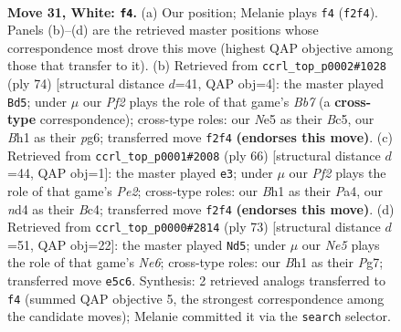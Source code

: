 \documentclass[11pt]{article}
\begin{document}
\clearpage

\begin{figure}[p]\centering
\begin{subfigure}{0.46\textwidth}\centering
\resizebox{\linewidth}{!}{%
\newchessgame
\chessboard[
  setfen={8/8/4k3/2ppNp2/3n4/1p6/1P2bP2/1K2B2B w - - 4 31},
  showmover=false,
  pgfstyle=straightmove, color=movearrow, markmove={f2-f4}
]}
\caption{}
\end{subfigure}\hfill
\begin{subfigure}{0.46\textwidth}\centering
\resizebox{\linewidth}{!}{%
\newchessgame
\chessboard[
  setfen={8/1B2ppk1/6p1/1bB2n2/1P3P2/7P/6K1/8 w - - 4 38},
  showmover=false,
  pgfstyle=straightmove, color=movearrow, markmove={b7-d5}
]}
\caption{}
\end{subfigure}
\\[4pt]
\begin{subfigure}{0.46\textwidth}\centering
\resizebox{\linewidth}{!}{%
\newchessgame
\chessboard[
  setfen={8/2B1k2p/5np1/p7/P1B1pP2/7P/3bPK2/8 w - - 6 34},
  showmover=false,
  pgfstyle=straightmove, color=movearrow, markmove={e2-e3}
]}
\caption{}
\end{subfigure}\hfill
\begin{subfigure}{0.46\textwidth}\centering
\resizebox{\linewidth}{!}{%
\newchessgame
\chessboard[
  setfen={4b3/5pp1/3kp3/7P/5P2/PN2nB2/1P1K4/8 b - - 2 37},
  showmover=false,
  pgfstyle=straightmove, color=movearrow, markmove={e3-d5}
]}
\caption{}
\end{subfigure}
\caption{\textbf{Move 31, White: \texttt{f4}.} (a) Our position; Melanie plays \texttt{f4} (\texttt{f2f4}). Panels (b)--(d) are the retrieved master positions whose correspondence most drove this move (highest QAP objective among those that transfer to it). (b) Retrieved from \texttt{ccrl\_top\_p0002\#1028} (ply 74) [structural distance $d$=41, QAP obj=4]: the master played \texttt{Bd5}; under $\mu$ our \emph{Pf2} plays the role of that game's \emph{Bb7} (a \textbf{cross-type} correspondence); cross-type roles: our \emph{N}e5 as their \emph{B}c5, our \emph{B}h1 as their \emph{p}g6; transferred move \texttt{f2f4} \textbf{(endorses this move)}. (c) Retrieved from \texttt{ccrl\_top\_p0001\#2008} (ply 66) [structural distance $d$=44, QAP obj=1]: the master played \texttt{e3}; under $\mu$ our \emph{Pf2} plays the role of that game's \emph{Pe2}; cross-type roles: our \emph{B}h1 as their \emph{P}a4, our \emph{n}d4 as their \emph{B}c4; transferred move \texttt{f2f4} \textbf{(endorses this move)}. (d) Retrieved from \texttt{ccrl\_top\_p0000\#2814} (ply 73) [structural distance $d$=51, QAP obj=22]: the master played \texttt{Nd5}; under $\mu$ our \emph{Ne5} plays the role of that game's \emph{Ne6}; cross-type roles: our \emph{B}h1 as their \emph{P}g7; transferred move \texttt{e5c6}. Synthesis: 2 retrieved analogs transferred to \texttt{f4} (summed QAP objective 5, the strongest correspondence among the candidate moves); Melanie committed it via the \texttt{search} selector.}
\label{fig:thought-m60}
\end{figure}
\end{document}
